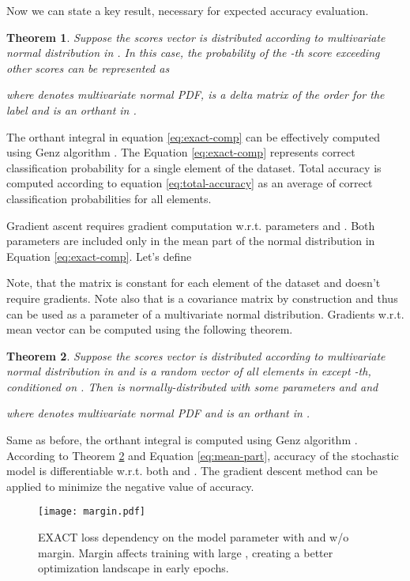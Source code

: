 \documentclass[nohyperref]{article}
\theoremstyle{plain}
\newtheorem{theorem}{Theorem}[section]
\theoremstyle{definition}
\theoremstyle{remark}
\begin{document}
Now we can state a key result, necessary for expected accuracy evaluation.
\vskip 0.05in
\begin{theorem}
Suppose the scores vector  is distributed according to multivariate normal distribution  in . In this case, the probability of the -th score exceeding other scores can be represented as

where  denotes multivariate normal PDF,  is a delta matrix of the order  for the label  and  is an orthant in .
\end{theorem}
The orthant integral in equation \ref{eq:exact-comp} can be effectively computed using Genz algorithm \cite{genz1992numerical}. The Equation \ref{eq:exact-comp} represents correct classification probability for a single element of the dataset. Total accuracy is computed according to equation \ref{eq:total-accuracy} as an average of correct classification probabilities for all elements.



Gradient ascent requires gradient computation w.r.t. parameters  and . Both parameters are included only in the mean part of the normal distribution in Equation \ref{eq:exact-comp}. Let's define

Note, that the matrix  is constant for each element of the dataset and doesn't require gradients. Note also that  is a covariance matrix by construction and thus can be used as a parameter of a multivariate normal distribution. Gradients w.r.t. mean vector  can be computed using the following theorem.
\vskip 0.1in
\begin{theorem}
\label{theor:grad}
Suppose the scores vector  is distributed according to multivariate normal distribution  in  and  is a random vector of all elements in  except -th, conditioned on . Then  is normally-distributed with some parameters  and  and

where  denotes multivariate normal PDF and  is an orthant in .
\end{theorem}
Same as before, the orthant integral is computed using Genz algorithm \cite{genz1992numerical}.
According to Theorem \ref{theor:grad} and Equation \ref{eq:mean-part}, accuracy of the stochastic model is differentiable w.r.t. both  and . The gradient descent method can be applied to minimize the negative value of accuracy.





\begin{figure}[t]
\vskip 0.1in
\centering
\texttt{[image: margin.pdf]}
\caption{EXACT loss dependency on the model parameter with and w/o margin. Margin affects training with large , creating a better optimization landscape in early epochs.}
\label{fig:margin}
\end{figure}
\end{document}
